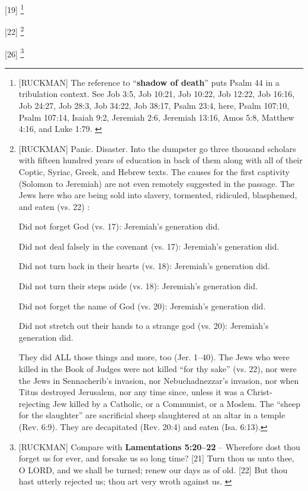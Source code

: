 [19] \footnote{[RUCKMAN] The reference to ``\textbf{shadow of death}'' puts Psalm 44 in a tribulation context. See Job 3:5, Job 10:21, Job 10:22, Job 12:22, Job 16:16, Job 24:27, Job 28:3, Job 34:22, Job 38:17, Psalm 23:4, here, Psalm 107:10, Psalm 107:14, Isaiah 9:2, Jeremiah 2:6, Jeremiah 13:16, Amos 5:8, Matthew 4:16, and Luke 1:79. \cite{Ruckman1992Psalms}  }

[22] \footnote{[RUCKMAN] Panic. Disaster. Into the dumpster go three thousand scholars with fifteen hundred years of education in back of them along with all of their Coptic, Syriac, Greek, and Hebrew texts. The causes for the first captivity (Solomon to Jeremiah) are not even remotely suggested in the passage. The Jews here who are being sold into slavery, tormented, ridiculed, blasphemed, and eaten (vs. 22)  \cite{Ruckman1992Psalms}   :\begin{compactenum}
\item Did not forget God (vs. 17): Jeremiah’s generation did. 
\item Did not deal falsely in the covenant (vs. 17): Jeremiah’s generation did.
\item Did not turn back in their hearts (vs. 18): Jeremiah’s generation did.
\item Did not turn their steps aside (vs. 18): Jeremiah’s generation did.
\item Did not forget the name of God (vs. 20): Jeremiah’s generation did.
\item Did not stretch out their hands to a strange god (vs. 20): Jeremiah’s generation did.
\end{compactenum} 
They did ALL those things and more, too (Jer. 1–40).  The Jews who were killed in the Book of Judges were not killed “for thy sake” (vs. 22), nor were the Jews in Sennacherib’s invasion, nor Nebuchadnezzar’s invasion, nor when Titus destroyed Jerusalem, nor any time since, unless it was a Christ-rejecting Jew killed by a Catholic, or a Communist, or a Moslem. The “sheep for the slaughter” are sacrificial sheep slaughtered at an altar in a temple (Rev. 6:9). They are decapitated (Rev. 20:4) and eaten (Isa. 6:13).}

[26] \footnote{[RUCKMAN] Compare with \textbf{Lamentations 5:20--22} -- Wherefore dost thou forget us for ever, and forsake us so long time? [21] Turn thou us unto thee, O LORD, and we shall be turned; renew our days as of old. [22] But thou hast utterly rejected us; thou art very wroth against us. \cite{Ruckman1992Psalms}  }



